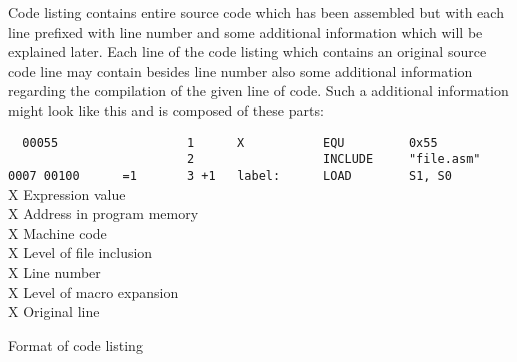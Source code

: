     Code listing contains entire source code which has been assembled but with each line prefixed with line number and some additional information which will be explained later. Each line of the code listing which contains an original source code line may contain besides line number also some additional information regarding the compilation of the given line of code. Such a additional information might look like this and is composed of these parts:

    \begin{code}[h]
        \verb'  '{\color{highlight_lst_number}\verb'00055'}\verb'                  '{\color{highlight_lst_line}\verb'1'}\verb'      '{\color{highlight_comment}\verb'X           EQU         0x55'}\\
        \verb'                         '{\color{highlight_lst_line}\verb'2'}\verb'      '{\color{highlight_comment}\verb'            INCLUDE     "file.asm"'}\\
        {\color{highlight_lst_address}\verb'0007'}\verb' '{\color{highlight_lst_code}\verb'00100'}\verb'      '{\color{highlight_label}\verb'=1'}\verb'       '{\color{highlight_lst_line}\verb'3'}\verb' '{\color{highlight_constant}\verb'+1'}\verb'   '{\color{highlight_comment}\verb'label:      LOAD        S1, S0'}\\

        \colorbox{highlight_lst_number}{\color{highlight_lst_number}X} Expression value\\
        \colorbox{highlight_lst_address}{\color{highlight_lst_address}X} Address in program memory\\
        \colorbox{highlight_lst_code}{\color{highlight_lst_code}X} Machine code\\
        \colorbox{highlight_label}{\color{highlight_label}X} Level of file inclusion\\
        \colorbox{highlight_lst_line}{\color{highlight_lst_line}X} Line number\\
        \colorbox{highlight_constant}{\color{highlight_constant}X} Level of macro expansion\\
        \colorbox{highlight_comment}{\color{highlight_comment}X} Original line
        \caption{Format of code listing}
    \end{code}

